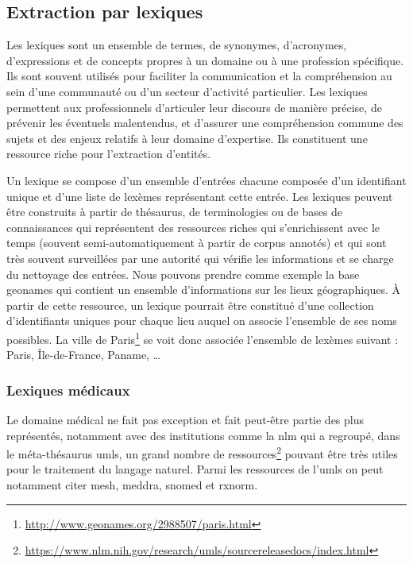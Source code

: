 \subsection{Extraction par lexiques}
\label{sec:ie:lexicon}

Les lexiques sont un ensemble de termes, de synonymes, d'acronymes, d'expressions et de concepts propres à un domaine ou à une profession spécifique.
Ils sont souvent utilisés pour faciliter la communication et la compréhension au sein d'une communauté ou d'un secteur d'activité particulier.
Les lexiques permettent aux professionnels d'articuler leur discours de manière précise, de prévenir les éventuels malentendus, et d'assurer une compréhension commune des sujets et des enjeux relatifs à leur domaine d'expertise.
Ils constituent une ressource riche pour l'extraction d'entités.

Un lexique se compose d'un ensemble d'entrées chacune composée d'un identifiant unique et d'une liste de lexèmes représentant cette entrée.
Les lexiques peuvent être construits à partir de thésaurus, de terminologies ou de bases de connaissances qui représentent des ressources riches qui s'enrichissent avec le temps (souvent semi-automatiquement à partir de corpus annotés) et qui sont très souvent surveillées par une autorité qui vérifie les informations et se charge du nettoyage des entrées.
Nous pouvons prendre comme exemple la base \gls{geonames} qui contient un ensemble d'informations sur les lieux géographiques.
À partir de cette ressource, un lexique pourrait être constitué d'une collection d'identifiants uniques pour chaque lieu auquel on associe l'ensemble de ses noms possibles.
La ville de Paris\footnote{\url{http://www.geonames.org/2988507/paris.html}} se voit donc associée l'ensemble de lexèmes suivant : Paris, Île-de-France, Paname, \dots

\subsubsection{Lexiques médicaux}

Le domaine médical ne fait pas exception et fait peut-être partie des plus représentés, notamment avec des institutions comme la \gls{nlm} qui a regroupé, dans le méta-thésaurus \gls{umls}, un grand nombre de ressources\footnote{\url{https://www.nlm.nih.gov/research/umls/sourcereleasedocs/index.html}} pouvant être très utiles pour le traitement du langage naturel.
Parmi les ressources de l'\gls{umls} on peut notamment citer \gls{mesh}, \gls{meddra}, \gls{snomed} et \gls{rxnorm}.

